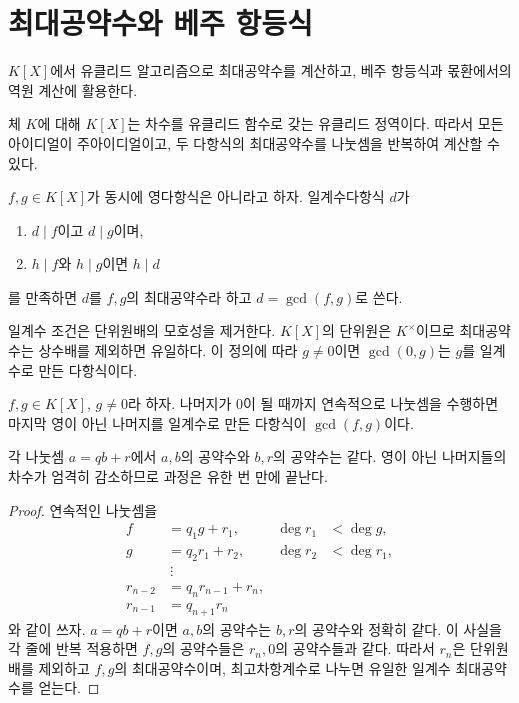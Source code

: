 \clearpage
\section{최대공약수와 베주 항등식}
\label{sec:polynomial-gcd}

\begin{learninggoal}
$K[X]$에서 유클리드 알고리즘으로 최대공약수를 계산하고, 베주 항등식과 몫환에서의 역원 계산에 활용한다.
\end{learninggoal}

체 $K$에 대해 $K[X]$는 차수를 유클리드 함수로 갖는 유클리드 정역이다. 따라서 모든 아이디얼이 주아이디얼이고, 두 다항식의 최대공약수를 나눗셈을 반복하여 계산할 수 있다.

\begin{definition}
$f,g\in K[X]$가 동시에 영다항식은 아니라고 하자. 일계수다항식 $d$가
\begin{enumerate}[label=(\roman*)]
  \item $d\mid f$이고 $d\mid g$이며,
  \item $h\mid f$와 $h\mid g$이면 $h\mid d$
\end{enumerate}
를 만족하면 $d$를 $f,g$의 최대공약수라 하고 $d=\gcd(f,g)$로 쓴다.
\end{definition}

일계수 조건은 단위원배의 모호성을 제거한다. $K[X]$의 단위원은 $K^\times$이므로 최대공약수는 상수배를 제외하면 유일하다. 이 정의에 따라 $g\ne0$이면 $\gcd(0,g)$는 $g$를 일계수로 만든 다항식이다.

\begin{theorem}
$f,g\in K[X]$, $g\ne0$라 하자. 나머지가 $0$이 될 때까지 연속적으로 나눗셈을 수행하면 마지막 영이 아닌 나머지를 일계수로 만든 다항식이 $\gcd(f,g)$이다.
\end{theorem}

\begin{proofidea}
각 나눗셈 $a=qb+r$에서 $a,b$의 공약수와 $b,r$의 공약수는 같다. 영이 아닌 나머지들의 차수가 엄격히 감소하므로 과정은 유한 번 만에 끝난다.
\end{proofidea}

\begin{proof}
연속적인 나눗셈을
\[
\begin{aligned}
 f&=q_1g+r_1, &\deg r_1&<\deg g,\\
 g&=q_2r_1+r_2, &\deg r_2&<\deg r_1,\\
 &\ \vdots\\
 r_{n-2}&=q_nr_{n-1}+r_n,\\
 r_{n-1}&=q_{n+1}r_n
\end{aligned}
\]
와 같이 쓰자. $a=qb+r$이면 $a,b$의 공약수는 $b,r$의 공약수와 정확히 같다. 이 사실을 각 줄에 반복 적용하면 $f,g$의 공약수들은 $r_n,0$의 공약수들과 같다. 따라서 $r_n$은 단위원배를 제외하고 $f,g$의 최대공약수이며, 최고차항계수로 나누면 유일한 일계수 최대공약수를 얻는다.
\end{proof}

